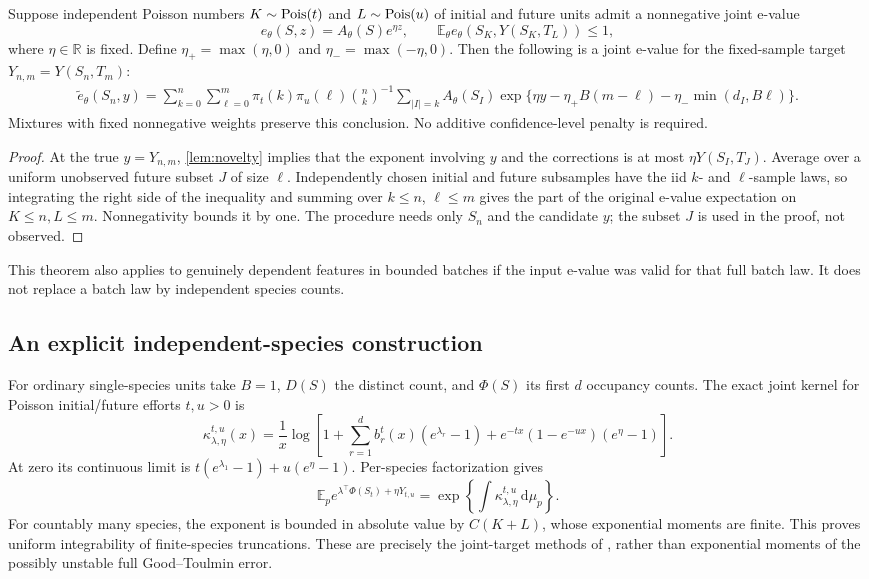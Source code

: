 \documentclass[11pt]{article}
\numberwithin{equation}{section}
\theoremstyle{definition}
\theoremstyle{remark}
\newcommand{\E}{\mathbb E}\newcommand{\Pp}{\mathbb P}\newcommand{\R}{\mathbb R}\newcommand{\N}{\mathbb N}
\newcommand{\dd}{\,\mathrm d}\newcommand{\norm}[1]{\left\lVert#1\right\rVert}\newcommand{\Scal}{\mathsf S}\newcommand{\Tcal}{\mathsf T}
\begin{document}
\begin{proposition}\label{prop:jointdelete}
Suppose independent Poisson numbers $K\sim\operatorname{Pois}(t)$ and $L\sim\operatorname{Pois}(u)$ of initial and future units admit a nonnegative joint e-value
\[
 e_\theta(S,z)=A_\theta(S)e^{\eta z},\qquad
 \E_\theta e_\theta(S_K,Y(S_K,T_L))\le1,
\]
where $\eta\in\R$ is fixed. Define $\eta_+=\max(\eta,0)$ and $\eta_-=\max(-\eta,0)$. Then the following is a joint e-value for the fixed-sample target $Y_{n,m}=Y(S_n,T_m)$:
\begin{align}\label{eq:genericjoint}
 \widetilde e_\theta(S_n,y)
 =\sum_{k=0}^n\sum_{\ell=0}^m\pi_t(k)\pi_u(\ell)\binom nk^{-1}
 \sum_{|I|=k} A_\theta(S_I)
 \exp\{\eta y-\eta_+B(m-\ell)-\eta_-\min(d_I,B\ell)\}.
\end{align}
Mixtures with fixed nonnegative weights preserve this conclusion. No additive confidence-level penalty is required.
\end{proposition}
\begin{proof}
At the true $y=Y_{n,m}$, \cref{lem:novelty} implies that the exponent involving $y$ and the corrections is at most $\eta Y(S_I,T_J)$. Average over a uniform unobserved future subset $J$ of size $\ell$. Independently chosen initial and future subsamples have the iid $k$- and $\ell$-sample laws, so integrating the right side of the inequality and summing over $k\le n$, $\ell\le m$ gives the part of the original e-value expectation on $K\le n,L\le m$. Nonnegativity bounds it by one. The procedure needs only $S_n$ and the candidate $y$; the subset $J$ is used in the proof, not observed.
\end{proof}
This theorem also applies to genuinely dependent features in bounded batches if the input e-value was valid for that full batch law. It does not replace a batch law by independent species counts.

\subsection{An explicit independent-species construction}
For ordinary single-species units take $B=1$, $D(S)$ the distinct count, and $\Phi(S)$ its first $d$ occupancy counts. The exact joint kernel for Poisson initial/future efforts $t,u>0$ is
\begin{equation}\label{eq:jointYkernel}
 \kappa_{\lambda,\eta}^{t,u}(x)
 =\frac1x\log\left[
 1+\sum_{r=1}^d b_r^t(x)(e^{\lambda_r}-1)
   +e^{-tx}(1-e^{-ux})(e^\eta-1)\right].
\end{equation}
At zero its continuous limit is $t(e^{\lambda_1}-1)+u(e^\eta-1)$. Per-species factorization gives
\[
 \E_p e^{\lambda^\top\Phi(S_t)+\eta Y_{t,u}}
 =\exp\left\{\int\kappa_{\lambda,\eta}^{t,u}\dd\mu_p\right\}.
\]
For countably many species, the exponent is bounded in absolute value by $C(K+L)$, whose exponential moments are finite. This proves uniform integrability of finite-species truncations. These are precisely the joint-target methods of \cite[Theorem 7.2 and Section 8.3]{LongI}, rather than exponential moments of the possibly unstable full Good--Toulmin error.
\end{document}
